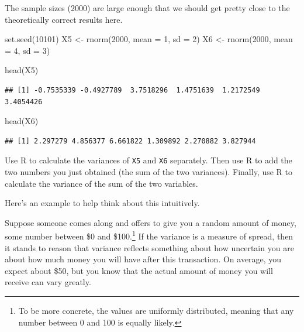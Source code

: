 \documentclass[
]{book}
\newenvironment{Shaded}{\begin{snugshade}}{\end{snugshade}}
\newcommand{\AttributeTok}[1]{\textcolor[rgb]{0.77,0.63,0.00}{#1}}
\newcommand{\DecValTok}[1]{\textcolor[rgb]{0.00,0.00,0.81}{#1}}
\newcommand{\FunctionTok}[1]{\textcolor[rgb]{0.00,0.00,0.00}{#1}}
\newcommand{\NormalTok}[1]{#1}
\newcommand{\OtherTok}[1]{\textcolor[rgb]{0.56,0.35,0.01}{#1}}
\begin{document}
The sample sizes (2000) are large enough that we should get pretty close to the theoretically correct results here.

\begin{Shaded}
\begin{Highlighting}[]
\FunctionTok{set.seed}\NormalTok{(}\DecValTok{10101}\NormalTok{)}
\NormalTok{X5 }\OtherTok{\textless{}{-}} \FunctionTok{rnorm}\NormalTok{(}\DecValTok{2000}\NormalTok{, }\AttributeTok{mean =} \DecValTok{1}\NormalTok{, }\AttributeTok{sd =} \DecValTok{2}\NormalTok{)}
\NormalTok{X6 }\OtherTok{\textless{}{-}} \FunctionTok{rnorm}\NormalTok{(}\DecValTok{2000}\NormalTok{, }\AttributeTok{mean =} \DecValTok{4}\NormalTok{, }\AttributeTok{sd =} \DecValTok{3}\NormalTok{)}
\end{Highlighting}
\end{Shaded}

\begin{Shaded}
\begin{Highlighting}[]
\FunctionTok{head}\NormalTok{(X5)}
\end{Highlighting}
\end{Shaded}

\begin{verbatim}
## [1] -0.7535339 -0.4927789  3.7518296  1.4751639  1.2172549  3.4054426
\end{verbatim}

\begin{Shaded}
\begin{Highlighting}[]
\FunctionTok{head}\NormalTok{(X6)}
\end{Highlighting}
\end{Shaded}

\begin{verbatim}
## [1] 2.297279 4.856377 6.661822 1.309892 2.270882 3.827944
\end{verbatim}

Use R to calculate the variances of \texttt{X5} and \texttt{X6} separately. Then use R to add the two numbers you just obtained (the sum of the two variances). Finally, use R to calculate the variance of the sum of the two variables.

Here's an example to help think about this intuitively.

Suppose someone comes along and offers to give you a random amount of money, some number between \$0 and \$100.\footnote{To be more concrete, the values are uniformly distributed, meaning that any number between 0 and 100 is equally likely.} If the variance is a measure of spread, then it stands to reason that variance reflects something about how uncertain you are about how much money you will have after this transaction. On average, you expect about \$50, but you know that the actual amount of money you will receive can vary greatly.
\end{document}
